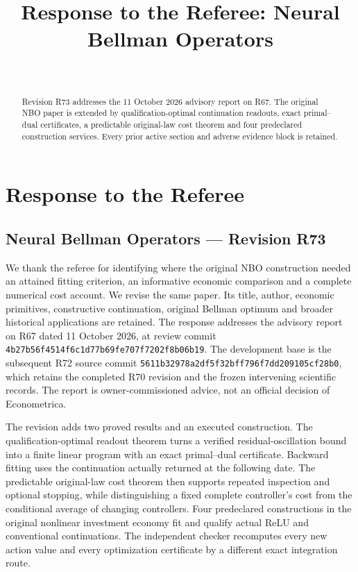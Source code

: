 \documentclass[ecta,nameyear,draft]{econsocart}
\begin{document}
\begin{frontmatter}
\title{Response to the Referee: Neural Bellman Operators}
\begin{aug}
\author[id=au1,addressref={add1}]{~}
\address[id=add1]{Peking University}
\end{aug}
\begin{abstract}Revision R73 addresses the 11 October 2026 advisory report on R67. The original NBO paper is extended by qualification-optimal continuation readouts, exact primal--dual certificates, a predictable original-law cost theorem and four predeclared construction services. Every prior active section and adverse evidence block is retained.\end{abstract}
\end{frontmatter}
\providecommand{\tightlist}{\setlength{\itemsep}{0pt}\setlength{\parskip}{0pt}}
\hypertarget{response-to-the-referee}{%
\section{Response to the Referee}\label{response-to-the-referee}}

\hypertarget{neural-bellman-operators-revision-r73}{%
\subsection{Neural Bellman Operators --- Revision
R73}\label{neural-bellman-operators-revision-r73}}

We thank the referee for identifying where the original NBO construction
needed an attained fitting criterion, an informative economic comparison
and a complete numerical cost account. We revise the same paper. Its
title, author, economic primitives, constructive continuation, original
Bellman optimum and broader historical applications are retained. The
response addresses the advisory report on R67 dated 11 October 2026, at
review commit \nolinkurl{4b27b56f4514f6c1d77b69fe707f7202f8b06b19}. The
development base is the subsequent R72 source commit
\nolinkurl{5611b32978a2df5f32bff796f7dd209105cf28b0}, which retains the
completed R70 revision and the frozen intervening scientific records.
The report is owner-commissioned advice, not an official decision of
Econometrica.

The revision adds two proved results and an executed construction. The
qualification-optimal readout theorem turns a verified
residual-oscillation bound into a finite linear program with an exact
primal--dual certificate. Backward fitting uses the continuation
actually returned at the following date. The predictable original-law
cost theorem then supports repeated inspection and optional stopping,
while distinguishing a fixed complete controller's cost from the
conditional average of changing controllers. Four predeclared
constructions in the original nonlinear investment economy fit and
qualify actual ReLU and conventional continuations. The independent
checker recomputes every new action value and every optimization
certificate by a different exact integration route.
\end{document}
